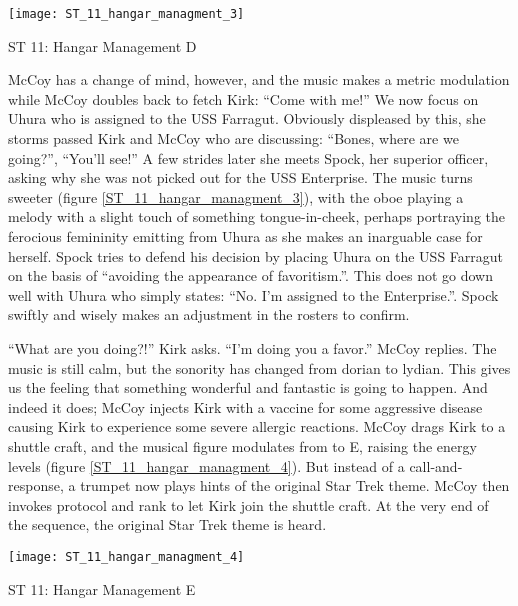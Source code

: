 \begin{marginfigure}
\center
\texttt{[image: ST\_11\_hangar\_managment\_3]}
	\caption{ST 11: Hangar Management D}
	\label{ST_11_hangar_managment_3}
\end{marginfigure}
McCoy has a change of mind, however, and the music makes a metric modulation while McCoy doubles back to fetch Kirk: ``Come with me!'' We now focus on Uhura who is assigned to the USS Farragut. Obviously displeased by this, she storms passed Kirk and McCoy who are discussing: ``Bones, where are we going?'', ``You'll see!'' A few strides later she meets Spock, her superior officer, asking why she was not picked out for the USS Enterprise. The music turns sweeter (figure \ref{ST_11_hangar_managment_3}), with the oboe playing a melody with a slight touch of something tongue-in-cheek, perhaps portraying the ferocious femininity emitting from Uhura as she makes an inarguable case for herself. Spock tries to defend his decision by placing Uhura on the USS Farragut on the basis of ``avoiding the appearance of favoritism.''. This does not go down well with Uhura who simply states: ``No. I'm assigned to the Enterprise.''. Spock swiftly and wisely makes an adjustment in the rosters to confirm.

``What are you doing?!'' Kirk asks. ``I'm doing you a favor.'' McCoy replies. The music is still calm, but the sonority has changed from dorian to lydian. This gives us the feeling that something wonderful and fantastic is going to happen. And indeed it does; McCoy injects Kirk with a vaccine for some aggressive disease causing Kirk to experience some severe allergic reactions. McCoy drags Kirk to a shuttle craft, and the musical figure modulates from \dflat to E, raising the energy levels (figure \ref{ST_11_hangar_managment_4}). But instead of a call-and-response, a trumpet now plays hints of the original Star Trek theme. McCoy then invokes protocol and rank to let Kirk join the shuttle craft. At the very end of the sequence, the original Star Trek theme is heard.

\begin{marginfigure}
\center
\texttt{[image: ST\_11\_hangar\_managment\_4]}
	\caption{ST 11: Hangar Management E}
	\label{ST_11_hangar_managment_4}
\end{marginfigure}

\clearpage


